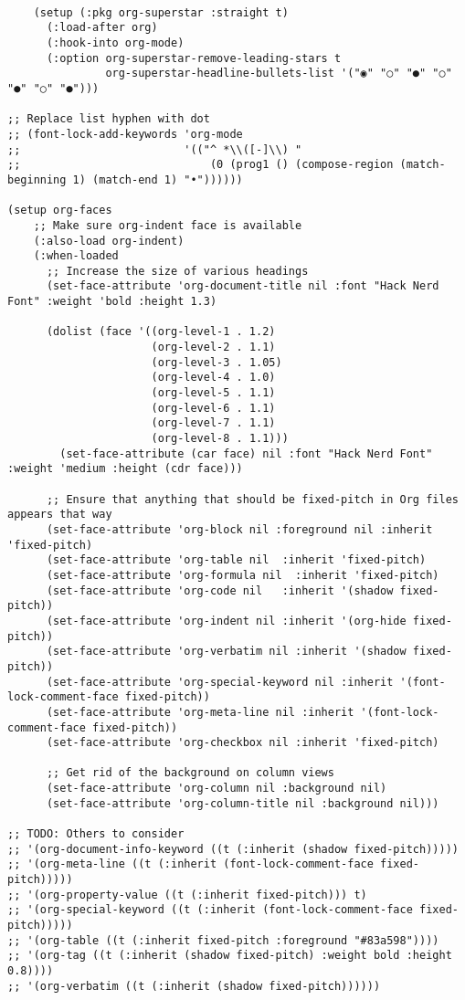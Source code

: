\documentclass[11pt]{article}
\begin{document}
\begin{verbatim}

    (setup (:pkg org-superstar :straight t)
      (:load-after org)
      (:hook-into org-mode)
      (:option org-superstar-remove-leading-stars t
               org-superstar-headline-bullets-list '("◉" "○" "●" "○" "●" "○" "●")))

;; Replace list hyphen with dot
;; (font-lock-add-keywords 'org-mode
;;                         '(("^ *\\([-]\\) "
;;                             (0 (prog1 () (compose-region (match-beginning 1) (match-end 1) "•"))))))

(setup org-faces
    ;; Make sure org-indent face is available
    (:also-load org-indent)
    (:when-loaded
      ;; Increase the size of various headings
      (set-face-attribute 'org-document-title nil :font "Hack Nerd Font" :weight 'bold :height 1.3)

      (dolist (face '((org-level-1 . 1.2)
                      (org-level-2 . 1.1)
                      (org-level-3 . 1.05)
                      (org-level-4 . 1.0)
                      (org-level-5 . 1.1)
                      (org-level-6 . 1.1)
                      (org-level-7 . 1.1)
                      (org-level-8 . 1.1)))
        (set-face-attribute (car face) nil :font "Hack Nerd Font" :weight 'medium :height (cdr face)))

      ;; Ensure that anything that should be fixed-pitch in Org files appears that way
      (set-face-attribute 'org-block nil :foreground nil :inherit 'fixed-pitch)
      (set-face-attribute 'org-table nil  :inherit 'fixed-pitch)
      (set-face-attribute 'org-formula nil  :inherit 'fixed-pitch)
      (set-face-attribute 'org-code nil   :inherit '(shadow fixed-pitch))
      (set-face-attribute 'org-indent nil :inherit '(org-hide fixed-pitch))
      (set-face-attribute 'org-verbatim nil :inherit '(shadow fixed-pitch))
      (set-face-attribute 'org-special-keyword nil :inherit '(font-lock-comment-face fixed-pitch))
      (set-face-attribute 'org-meta-line nil :inherit '(font-lock-comment-face fixed-pitch))
      (set-face-attribute 'org-checkbox nil :inherit 'fixed-pitch)

      ;; Get rid of the background on column views
      (set-face-attribute 'org-column nil :background nil)
      (set-face-attribute 'org-column-title nil :background nil)))

;; TODO: Others to consider
;; '(org-document-info-keyword ((t (:inherit (shadow fixed-pitch)))))
;; '(org-meta-line ((t (:inherit (font-lock-comment-face fixed-pitch)))))
;; '(org-property-value ((t (:inherit fixed-pitch))) t)
;; '(org-special-keyword ((t (:inherit (font-lock-comment-face fixed-pitch)))))
;; '(org-table ((t (:inherit fixed-pitch :foreground "#83a598"))))
;; '(org-tag ((t (:inherit (shadow fixed-pitch) :weight bold :height 0.8))))
;; '(org-verbatim ((t (:inherit (shadow fixed-pitch))))))

\end{verbatim}
\end{document}

